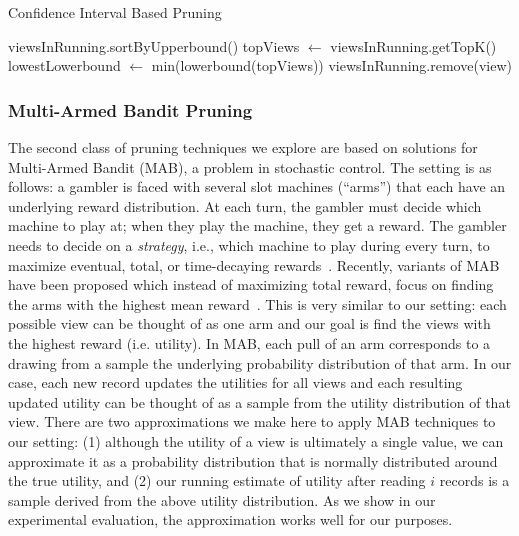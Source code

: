 \begin{algorithm}
\caption{Confidence Interval Based Pruning}
\label{algo:ci_based_pruning}
\begin{algorithmic}[1]
\State viewsInRunning.sortByUpperbound()
\State topViews $\gets$ viewsInRunning.getTopK()
\State lowestLowerbound $\gets$ min(lowerbound(topViews))
\State viewsInRunning.remove(view)
\EndIf
\EndFor
\end{algorithmic}
\end{algorithm}

\subsubsection{Multi-Armed Bandit Pruning}
\label{sec:multi_armed_bandit}
The second class of pruning techniques we explore
are based on solutions for Multi-Armed Bandit (MAB), a problem 
in stochastic control. 
The setting is as follows: 
a gambler is faced with several slot
machines (``arms'') that each have an underlying reward
distribution. 
At each turn, the gambler must decide which machine
to play at; when they play the machine, they get a reward.
The gambler needs to decide on a {\em strategy}, i.e.,
which machine to play during every turn, to maximize
eventual, total, or time-decaying rewards~\cite{bandits}.
Recently, variants of MAB have been proposed 
which instead of maximizing total reward, 
focus on finding the arms with the highest mean reward~\cite{BubeckWV13}.
This is very similar to our setting: each possible view can be thought of as
one arm and our goal is find the views with the highest reward (i.e.
utility).
In MAB, each pull of an arm corresponds to a drawing from a sample
the underlying probability distribution of that arm.
In our case, each new record updates the utilities for all views and
each resulting updated utility can be thought of as a sample from the
utility distribution of that view.
There are two approximations we make here to apply MAB techniques
to our setting: 
(1) although the utility of a
view is ultimately a single value, we can approximate it as a probability
distribution that is normally distributed around the true utility, and 
(2) our running estimate of utility after reading $i$
records is a sample derived from the above utility distribution.
As we show in our experimental evaluation, the approximation works well
for our purposes.

